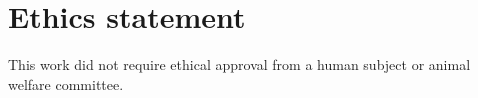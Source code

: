 \documentclass[11pt,a4paper]{article}
\begin{document}







\section*{Ethics statement}
This work did not require ethical approval from a human subject or animal welfare committee.
\end{document}

